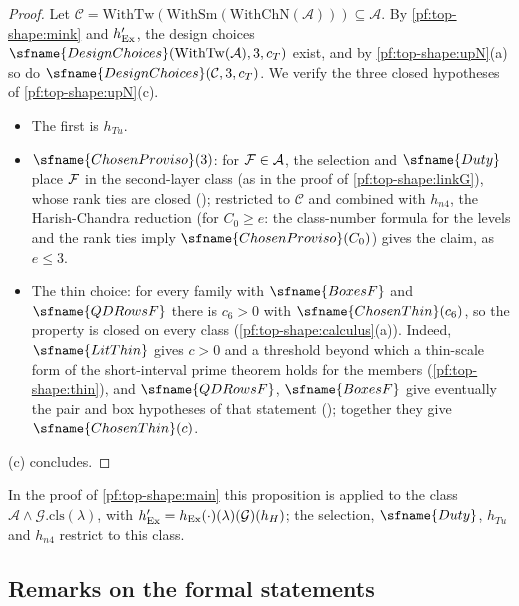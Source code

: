\begin{proof}
Let $\mathcal C=\mathrm{WithTw}(\mathrm{WithSm}(\mathrm{WithChN}(\mathcal A)))\subseteq\mathcal A$. By
\cref{pf:top-shape:mink} and $h'_{\rm Ex}$, the design choices $\sfname{DesignChoices}(\mathrm{WithTw}(\mathcal A),3,c_T)$
exist, and by \cref{pf:top-shape:upN}(a) so do $\sfname{DesignChoices}(\mathcal C,3,c_T)$. We verify the three closed
hypotheses of \cref{pf:top-shape:upN}(c).
\begin{itemize}
\item The first is $h_{Tu}$.
\item $\sfname{ChosenProviso}(3)$: for $\mathcal{F}\in\mathcal A$, the selection and $\sfname{Duty}$ place $\mathcal{F}$ in
the second-layer class (as in the proof of \cref{pf:top-shape:linkG}), whose rank ties are closed
(); restricted to $\mathcal C$ and combined
with $h_{n4}$, the Harish-Chandra reduction 
(for $C_0\ge e$: the class-number formula for the levels and the rank ties imply $\sfname{ChosenProviso}(C_0)$) gives the
claim, as $e\le3$.
\item The thin choice: for every family with $\sfname{BoxesF}$ and $\sfname{QDRowsF}$ there is $c_6>0$ with
$\sfname{ChosenThin}(c_6)$, so the property is closed on every class (\cref{pf:top-shape:calculus}(a)). Indeed,
$\sfname{LitThin}$ gives $c>0$ and a threshold beyond which a thin-scale form of the short-interval prime theorem holds
for the members (\cref{pf:top-shape:thin}),
and $\sfname{QDRowsF}$, $\sfname{BoxesF}$ give eventually the pair and box hypotheses of that statement
(); together they give
$\sfname{ChosenThin}(c)$.
\end{itemize}
(c) concludes.
\end{proof}

In the proof of \cref{pf:top-shape:main} this proposition is applied to the class $\mathcal A\wedge\mathcal
G.\mathrm{cls}(\lambda)$, with $h'_{\rm Ex}=h_{\rm Ex}(\cdot)(\lambda)(\mathcal G)(h_H)$; the selection, $\sfname{Duty}$,
$h_{Tu}$ and $h_{n4}$ restrict to this class.

\subsection{Remarks on the formal statements}\label{sec:pf:top-shape:remarks}

